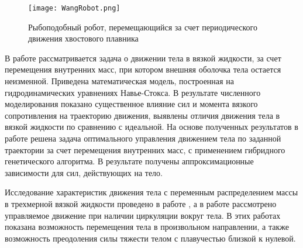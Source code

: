 \begin{figure}[h]
	\centering
	\texttt{[image: WangRobot.png]}%
	\caption{Рыбоподобный робот, перемещающийся за счет периодического движения хвостового плавника}
	\label{WangRobot}
\end{figure}

В работе \cite{Ramodanov_Tenenev} рассматривается задача о движении тела в вязкой жидкости, за счет перемещения внутренних масс, при котором внешняя оболочка тела остается неизменной. Приведена математическая модель, построенная на гидродинамических уравнениях Навье-Стокса. В результате численного моделирования показано существенное влияние сил и момента вязкого сопротивления на траекторию движения, выявлены отличия движения тела в вязкой жидкости по сравнению с идеальной. На основе полученных результатов в работе \cite{Vetchanin_Tenenev_2011} решена задача оптимального управления движением тела по заданной траектории за счет перемещения внутренних масс, с применением гибридного генетического алгоритма. В результате получены аппроксимационные зависимости для сил, действующих на тело.

Исследование характеристик движения тела с переменным распределением массы в трехмерной вязкой жидкости проведено в работе \cite{Vetchanin_Mamaev_Tenenev_ND_2012}, а в работе \cite{Kilin_Vetchanin_DAN_2016} рассмотрено управляемое движение при наличии циркуляции вокруг тела. В этих работах показана возможность перемещения тела в произвольном направлении, а также возможность преодоления силы тяжести телом с плавучестью близкой к нулевой.






